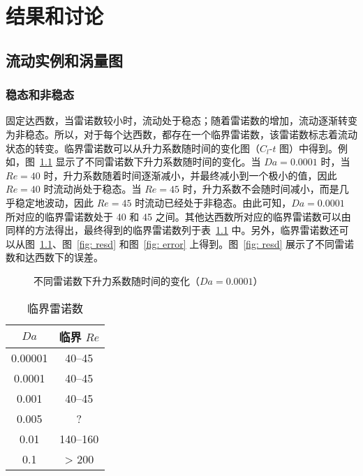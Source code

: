 \chapter{结果和讨论}

\section{流动实例和涡量图}

\subsection{稳态和非稳态}

固定达西数，当雷诺数较小时，流动处于稳态；随着雷诺数的增加，流动逐渐转变为非稳态。所以，对于每个达西数，都存在一个临界雷诺数，该雷诺数标志着流动状态的转变。临界雷诺数可以从升力系数随时间的变化图（$C_l$-$t$ 图）中得到。例如，图~\ref{fig: Cl_t} 显示了不同雷诺数下升力系数随时间的变化。当 $Da=0.0001$ 时，当 $Re=40$ 时，升力系数随着时间逐渐减小，并最终减小到一个极小的值，因此 $Re=40$ 时流动尚处于稳态。当 $Re=45$ 时，升力系数不会随时间减小，而是几乎稳定地波动，因此 $Re=45$ 时流动已经处于非稳态。由此可知，$Da=0.0001$ 所对应的临界雷诺数处于 40 和 45 之间。其他达西数所对应的临界雷诺数可以由同样的方法得出，最终得到的临界雷诺数列于表~\ref{tab: critical Re} 中。另外，临界雷诺数还可以从图~\ref{fig: Cl_t}、图~\ref{fig: resd} 和图~\ref{fig: error} 上得到。图~\ref{fig: resd} 展示了不同雷诺数和达西数下的误差。

\begin{figure}
	\setlength{\subfigcapskip}{-1bp}
	\centering
	\begin{minipage}{\textwidth}
		\centering
	\end{minipage}
	\centering
	\begin{minipage}{\textwidth}
		\centering
	\end{minipage}
	\vspace{0.2em}
	\caption{不同雷诺数下升力系数随时间的变化（$Da=0.0001$）}
	\label{fig: Cl_t}
\end{figure}

\begin{table}
	\caption{临界雷诺数}\label{tab: critical Re}
	\vspace{.5em}\centering\wuhao
	\begin{tabular}{cc}
		\toprule[1.5pt]
		$Da$ & 临界 $Re$ \\
		\midrule[1pt]
		0.00001 & 40--45 \\
		0.0001  & 40--45 \\
		0.001   & 40--45 \\
		0.005   & ? \\
		0.01    & 140--160 \\
		0.1     & > 200 \\
	\bottomrule[1.5pt]
	\end{tabular}
\end{table}

